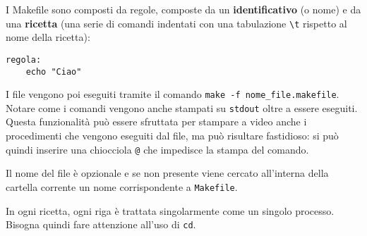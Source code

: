 \documentclass[a4paper]{article}
\begin{document}
I Makefile sono composti da regole, composte da un \textbf{identificativo} (o nome) e da una \textbf{ricetta} (una serie di comandi indentati con una tabulazione \verb|\t| rispetto al nome della ricetta):

\begin{verbatim}
regola:
    echo "Ciao"
\end{verbatim}

I file vengono poi eseguiti tramite il comando \verb|make -f nome_file.makefile|. Notare come i comandi vengono anche stampati su \verb|stdout| oltre a essere eseguiti. Questa funzionalità può essere sfruttata per stampare a video anche i procedimenti che vengono eseguiti dal file, ma può risultare fastidioso: si può quindi inserire una chiocciola \verb|@| che impedisce la stampa del comando.

Il nome del file è opzionale e se non presente viene cercato all'interna della cartella corrente un nome corrispondente a \verb|Makefile|.

In ogni ricetta, ogni riga è trattata singolarmente come un singolo processo. Bisogna quindi fare attenzione all'uso di \verb|cd|.
\end{document}
